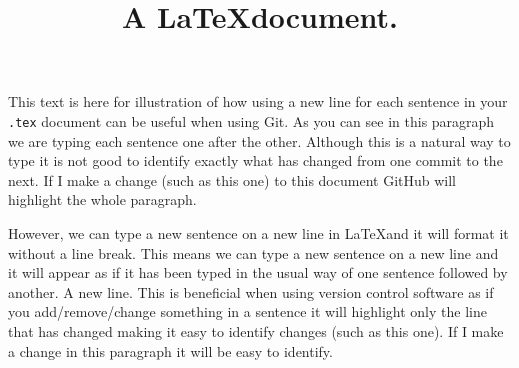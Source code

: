 \documentclass{article}
\begin{document}
	\title{A \LaTeX document.}
	\date{}
	\maketitle
	
	This text is here for illustration of how using a new line for each sentence in your \texttt{.tex} document can be useful when using Git. As you can see in this paragraph we are typing each sentence one after the other. Although this is a natural way to type it is not good to identify exactly what has changed from one commit to the next. If I make a change (such as this one) to this document GitHub will highlight the whole paragraph.
	
	However, we can type a new sentence on a new line in \LaTeX and it will format it without a line break.
	This means we can type a new sentence on a new line and it will appear as if it has been typed in the usual way of one sentence followed by another.
	A new line.
	This is beneficial when using version control software as if you add/remove/change something in a sentence it will highlight only the line that has changed making it easy to identify changes (such as this one).
	If I make a change in this paragraph it will be easy to identify.
	
\end{document}

